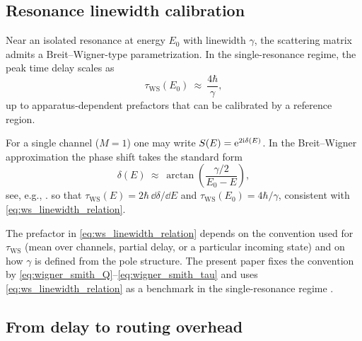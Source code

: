 \subsection{Resonance linewidth calibration}
\label{subsec:linewidth_calibration}

Near an isolated resonance at energy $E_0$ with linewidth $\gamma$, the scattering matrix admits a Breit--Wigner-type parametrization.
In the single-resonance regime, the peak time delay scales as
\begin{equation}
  \tau_{\mathrm{WS}}(E_0)\ \approx\ \frac{4\hbar}{\gamma},
  \label{eq:ws_linewidth_relation}
\end{equation}
up to apparatus-dependent prefactors that can be calibrated by a reference region.
\par
\noindent For a single channel ($M=1$) one may write $S(E)=\mathrm{e}^{2\mathrm{i}\delta(E)}$.
In the Breit--Wigner approximation the phase shift takes the standard form
\begin{equation}
  \delta(E)\ \approx\ \arctan\!\left(\frac{\gamma/2}{E_0-E}\right),
\end{equation}
see, e.g., \cite{BreitWigner1936}.
so that $\tau_{\mathrm{WS}}(E)=2\hbar\,\dd\delta/\dd E$ and $\tau_{\mathrm{WS}}(E_0)=4\hbar/\gamma$, consistent with \eqref{eq:ws_linewidth_relation}.

\begin{remark}
\label{rem:ws_conventions}
The prefactor in \eqref{eq:ws_linewidth_relation} depends on the convention used for $\tau_{\mathrm{WS}}$ (mean over channels, partial delay, or a particular incoming state) and on how $\gamma$ is defined from the pole structure.
The present paper fixes the convention by \eqref{eq:wigner_smith_Q}--\eqref{eq:wigner_smith_tau} and uses \eqref{eq:ws_linewidth_relation} as a benchmark in the single-resonance regime \cite{BreitWigner1936,Wigner1955,Smith1960}.
\end{remark}

\subsection{From delay to routing overhead}
\label{subsec:ws_to_kappa}

